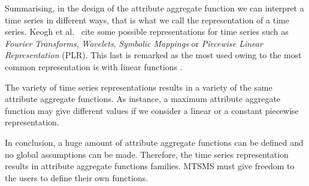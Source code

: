 
Summarising, in the design of the attribute aggregate function we can
interpret a time series in different ways, that is what we call the
representation of a time series. Keogh et al.\ \cite{last:keogh} cite
some possible representations for time series such as \emph{Fourier
  Transforms}, \emph{Wavelets}, \emph{Symbolic Mappings} or
\emph{Piecewise Linear Representation} (PLR). This last is remarked as
the most used owing to the most common representation is with linear
functions \cite{keogh01}.

The variety of time series representations results in a variety of the
same attribute aggregate functions. As instance, a maximum attribute
aggregate function may give different values if we consider a linear
or a constant piecewise representation. 

In conclusion, a huge amount of attribute aggregate functions can be
defined and no global assumptions can be made.  Therefore, the time
series representation results in attribute aggregate functions
families.  MTSMS must give freedom to the users to define
their own functions.








